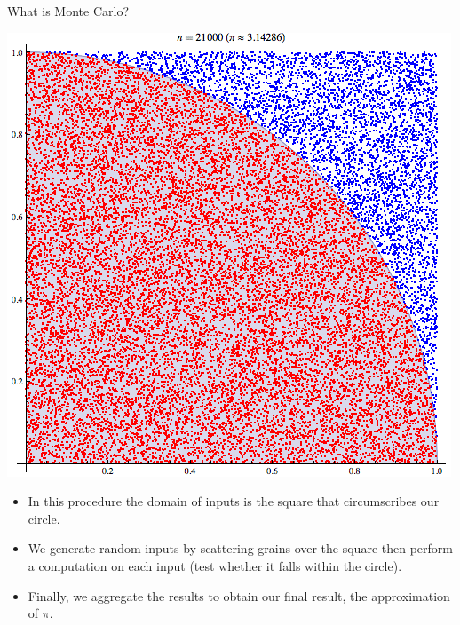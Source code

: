 \documentclass[11pt]{beamer}
\begin{document}
\begin{frame}{What is Monte Carlo?}
\noindent\begin{minipage}{0.5\textwidth}%
\includegraphics[width=\linewidth]{img/pi_greco_3.png}
\end{minipage}%
\hfill%
\begin{minipage}{0.5\textwidth}
\begin{itemize}
\item In this procedure the domain of inputs is the square that circumscribes our circle. 
\item We generate random inputs by scattering grains over the square then perform a computation on each input (test whether it falls within the circle). 
\item Finally, we aggregate the results to obtain our final result, the approximation of $\pi$.
\end{itemize}
\end{minipage}
\end{frame}
\end{document}
